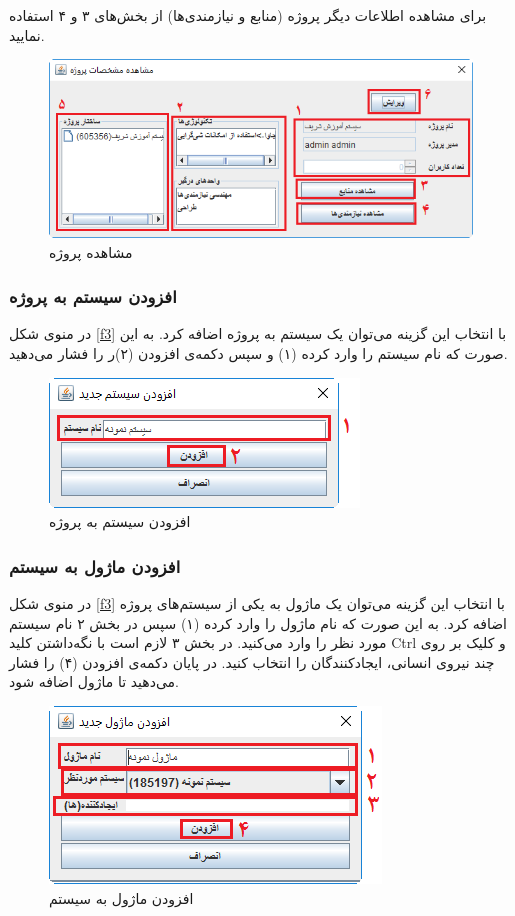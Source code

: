 برای مشاهده اطلاعات دیگر پروژه (منابع و نیازمندی‌ها) از بخش‌های ۳ و ۴ استفاده نمایید.
\begin{figure}[H]
	\centering
	\includegraphics[scale=0.8]{img/manual/projectAttr}
	\caption{مشاهده پروژه}
	\label{f2}
	\end{figure}	

\subsubsection{افزودن سیستم به پروژه}
در منوی شکل
\ref{f3}
با انتخاب این گزینه می‌توان یک سیستم به پروژه اضافه کرد. به این صورت که نام سیستم را وارد کرده (۱) و سپس دکمه‌ی افزودن  (۲)ر را فشار می‌دهید.
\begin{figure}[H]
	\centering
	\includegraphics[scale=0.8]{img/manual/addSys}
	\caption{افزودن سیستم به پروژه}
\end{figure}

\subsubsection{افزودن ماژول به سیستم}
در منوی شکل
\ref{f3}
با انتخاب این گزینه می‌توان یک  ماژول به یکی از سیستم‌های پروژه اضافه کرد. به این صورت که نام ماژول را وارد کرده (۱)  سپس در بخش ۲ نام سیستم مورد نظر را وارد می‌کنید. در بخش ۳ لازم است با نگه‌داشتن کلید Ctrl و کلیک بر روی چند نیروی انسانی، ایجادکنندگان را انتخاب کنید. در پایان دکمه‌ی افزودن  (۴) را فشار می‌دهید تا ماژول اضافه شود.
\begin{figure}[H]
	\centering
	\includegraphics[scale=0.8]{img/manual/addMod}
	\caption{افزودن ماژول به سیستم}
\end{figure}

